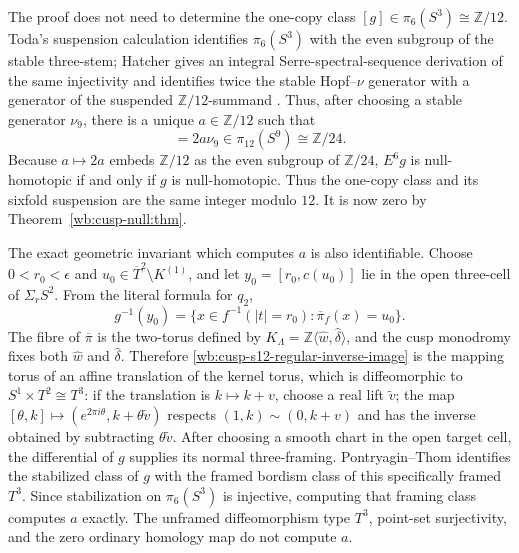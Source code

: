The proof does not need to determine the one-copy class
\([g]\in\pi_6(S^3)\cong\mathbb Z/12\).  Toda's suspension calculation
identifies \(\pi_6(S^3)\) with the even subgroup of the stable three-stem;
Hatcher gives an integral Serre-spectral-sequence derivation of the same
injectivity and identifies twice the stable Hopf--\(\nu\) generator with a
generator of the suspended \(\mathbb Z/12\)-summand
\cite[Theorem~5.41(b), p.~573, and pp.~577--578]{HatcherSpectralSequences}.
Thus, after choosing a stable generator \(\nu_9\), there is a unique
\(a\in\mathbb Z/12\) such that
\begin{equation}
 [E^6g]=2a\nu_9\in\pi_{12}(S^9)\cong\mathbb Z/24.
 \label{wb:cusp-s12-sixfold-suspension-class}
\end{equation}
Because \(a\mapsto2a\) embeds \(\mathbb Z/12\) as the even subgroup of
\(\mathbb Z/24\), \(E^6g\) is null-homotopic if and only if \(g\) is
null-homotopic.  Thus the one-copy class and its sixfold suspension are the
same integer modulo \(12\). It is now zero by Theorem~\ref{wb:cusp-null:thm}.

The exact geometric invariant which computes \(a\) is also identifiable.
Choose \(0<r_0<\epsilon\) and
\(u_0\in\overline T^2\setminus K^{(1)}\), and let
\(y_0=[r_0,c(u_0)]\) lie in the open three-cell of
\(\Sigma_rS^2\).  From the literal formula for \(q_2\),
\begin{equation}
 g^{-1}(y_0)
 =\{x\in f^{-1}(|t|=r_0):\overline\pi_f(x)=u_0\}.
 \label{wb:cusp-s12-regular-inverse-image}
\end{equation}
The fibre of \(\overline\pi\) is the two-torus defined by
\(K_\Lambda=\mathbb Z\langle\widehat w,\widehat\delta\rangle\), and the
cusp monodromy fixes both \(\widehat w\) and \(\widehat\delta\).  Therefore
\eqref{wb:cusp-s12-regular-inverse-image} is the mapping torus of an affine translation of the kernel torus,
which is diffeomorphic to \(S^1\times T^2\cong T^3\): if the translation is
\(k\mapsto k+v\), choose a real lift \(\widetilde v\); the map
\([\theta,k]\mapsto(e^{2\pi i\theta},k+\theta\widetilde v)\) respects
\((1,k)\sim(0,k+v)\) and has the inverse obtained by subtracting
\(\theta\widetilde v\). After choosing a smooth chart in the open
target cell, the differential of \(g\) supplies its normal three-framing.
Pontryagin--Thom identifies the stabilized class of \(g\) with the framed
bordism class of this specifically framed \(T^3\).  Since stabilization on
\(\pi_6(S^3)\) is injective, computing that framing class computes \(a\)
exactly.  The unframed diffeomorphism type \(T^3\), point-set surjectivity,
and the zero ordinary homology map do not compute \(a\).






